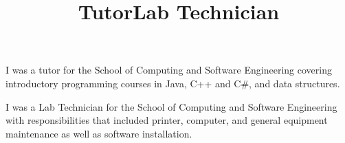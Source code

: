 \documentclass[margintitle,line]{res}
\renewcommand{\subsection}[1]{\section{\normalfont #1}}
\begin{document}
\begin{resume}
\title{Tutor}
\begin{position}
I was a tutor for the School of Computing and Software Engineering covering introductory programming courses in Java, C++ and C\#, and data structures.
\end{position}

\title{Lab Technician}
\begin{position}
I was a Lab Technician  for the School of Computing and Software Engineering with responsibilities that included printer, computer, and general equipment maintenance as well as software installation.
\end{position}
%






\setlength{\parskip}{1ex}





\end{resume}
\end{document}
